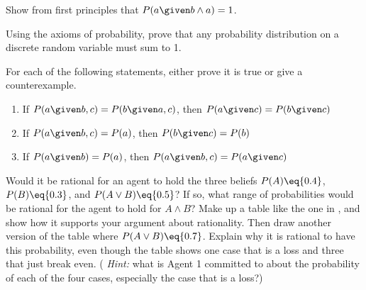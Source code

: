 
\begin{exercise}
Show from first principles that \(P(a\given b\land a) = 1\).
\end{exercise} 

\begin{exercise}%
Using the axioms of probability, prove that any probability
distribution on a discrete random variable must sum to 1.
\end{exercise} 

\begin{exercise}
For each of the following statements, either prove it is true or give a counterexample.
\begin{enumerate}
\item If \(P(a \given b, c) = P(b \given a, c)\), then \(P(a \given c) = P(b \given c)\)
\item If \(P(a \given b, c) = P(a)\), then \(P(b \given c) = P(b)\)
\item If \(P(a \given b) = P(a)\), then \(P(a \given b, c) = P(a \given c)\)
\end{enumerate}
\end{exercise} 

\begin{exercise}
Would it be rational for an agent to hold the three beliefs \(P(A) \eq {0.4}\),
\(P(B) \eq {0.3}\), and \(P(A \lor B) \eq {0.5}\)?  If so, what range of probabilities
would be rational for the agent to hold for \(A \land B\)?  Make up a table like
the one in , and show how it supports your argument
about rationality.  Then draw another version of the table where \(P(A \lor B)
\eq {0.7}\).  Explain why it is rational to have this probability, even though
the table shows one case that is a loss and three that just break even.  ({\em
Hint:} what is Agent 1 committed to about the probability of each of the four
cases, especially the case that is a loss?)
\end{exercise} 

